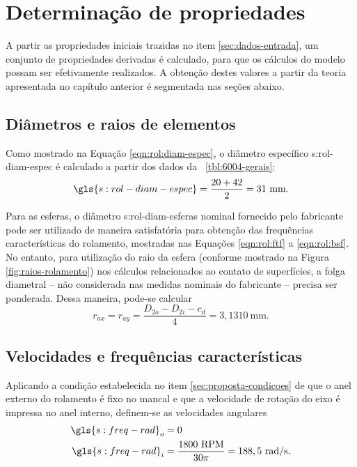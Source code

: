 \documentclass[12pt,oneside,english,brazil,lmodern,siglas,simbolos,cite=num]{ucsmonograph}
\begin{document}
	\section{Determinação de propriedades}
	A partir as propriedades iniciais trazidas no item \ref{sec:dados-entrada}, um conjunto de propriedades derivadas é calculado, para que os cálculos do modelo possam ser efetivamente realizados.
	A obtenção destes valores a partir da teoria apresentada no capítulo anterior é segmentada nas seções abaixo.

	\subsection{Diâmetros e raios de elementos}	
	Como mostrado na Equação \ref{eqn:rol:diam-espec}, o diâmetro específico \gls{s:rol-diam-espec} é calculado a partir dos dados da \tablename\ \ref{tbl:6004-gerais}:
	\begin{equation*}
		\gls{s:rol-diam-espec} = \frac{20 + 42}{2} = 31\ \text{mm}.
	\end{equation*}
	
	Para as esferas, o diâmetro \gls{s:rol-diam-esferas} nominal fornecido pelo fabricante pode ser utilizado de maneira satisfatória para obtenção das frequências características do rolamento, mostradas nas Equações \ref{eqn:rol:ftf} a \ref{eqn:rol:bsf}.
	No entanto, para utilização do raio da esfera (conforme mostrado na Figura \ref{fig:raios-rolamento}) nos cálculos relacionados ao contato de superfícies, a folga diametral -- não considerada nas medidas nominais do fabricante -- precisa ser ponderada.
	Dessa maneira, pode-se calcular
	\begin{equation}
		r_{ax} = r_{ay} = \frac{D_{2o} - D_{2i} - c_d}{4} = 3,1310\ \text{mm}.
	\end{equation}
	
	\subsection{Velocidades e frequências características}
	Aplicando a condição estabelecida no item \ref{sec:proposta-condicoes} de que o anel externo do rolamento é fixo no mancal e que a velocidade de rotação do eixo é impressa no anel interno, definem-se as velocidades angulares
	\setlength{}
	\begin{align}
		\gls{s:freq-rad}_o &= 0 \\
		\gls{s:freq-rad}_i &= \frac{1800\ \text{RPM}}{30\pi} = 188,5\ \text{rad/s}.
	\end{align}
	
\end{document}

